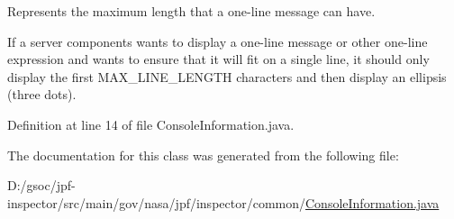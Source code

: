 Represents the maximum length that a one-\/line message can have. 

If a server components wants to display a one-\/line message or other one-\/line expression and wants to ensure that it will fit on a single line, it should only display the first M\+A\+X\+\_\+\+L\+I\+N\+E\+\_\+\+L\+E\+N\+G\+TH characters and then display an ellipsis (three dots). 

Definition at line 14 of file Console\+Information.\+java.



The documentation for this class was generated from the following file\+:\begin{DoxyCompactItemize}
\item 
D\+:/gsoc/jpf-\/inspector/src/main/gov/nasa/jpf/inspector/common/\hyperlink{_console_information_8java}{Console\+Information.\+java}\end{DoxyCompactItemize}
